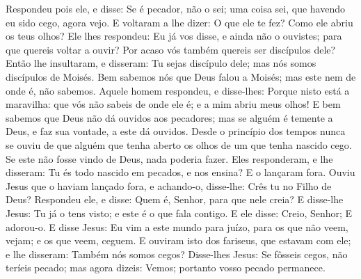 {Respondeu pois ele, e disse: Se é pecador, não o sei; uma coisa sei, que havendo eu sido cego, agora vejo.
E voltaram a lhe dizer: O que ele te fez? Como ele abriu os teus olhos?
Ele lhes respondeu: Eu já vos disse, e ainda não o ouvistes; para que quereis voltar a ouvir? Por acaso vós também quereis ser discípulos dele?
Então lhe insultaram, e disseram: Tu sejas discípulo dele; mas nós somos discípulos de Moisés.
Bem sabemos nós que Deus falou a Moisés; mas este nem de onde é, não sabemos.
Aquele homem respondeu, e disse-lhes: Porque nisto está a maravilha: que vós não sabeis de onde ele é; e a mim abriu meus olhos!
E bem sabemos que Deus não dá ouvidos aos pecadores; mas se alguém é temente a Deus, e faz sua vontade, a este dá ouvidos.
Desde o princípio dos tempos nunca se ouviu de que alguém que tenha aberto os olhos de um que tenha nascido cego.
Se este não fosse vindo de Deus, nada poderia fazer.
Eles responderam, e lhe disseram: Tu és todo nascido em pecados, e nos ensina? E o lançaram fora.
Ouviu Jesus que o haviam lançado fora, e achando-o, disse-lhe: Crês tu no Filho de Deus?
Respondeu ele, e disse: Quem é, Senhor, para que nele creia?
E disse-lhe Jesus: Tu já o tens visto; e este é o que fala contigo.
E ele disse: Creio, Senhor; E adorou-o.
E disse Jesus: Eu vim a este mundo para juízo, para os que não veem, vejam; e os que veem, ceguem.
E ouviram isto
{} dos fariseus, que estavam com ele; e lhe disseram: Também nós somos cegos?
Disse-lhes Jesus: Se fôsseis cegos, não teríeis pecado; mas agora dizeis: Vemos; portanto vosso pecado permanece.

}
